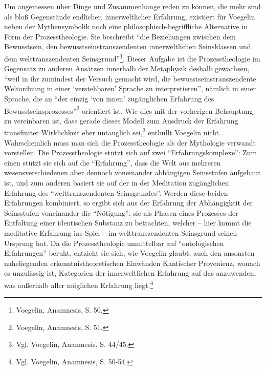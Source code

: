 Um angemessen über Dinge und Zusammenhänge reden zu können, die mehr sind als
bloß Gegenstände endlicher, innerweltlicher Erfahrung, existiert für Voegelin
neben der Mythensymbolik noch eine philosophisch-begriffliche Alternative in
Form der Prozesstheologie. Sie beschreibt "`die Beziehungen zwischen dem
Bewusstsein, den bewusstseinstranszendenten innerweltlichen Seinsklassen und
dem welttranszendenten Seinsgrund"'\footnote{Voegelin, Anamnesis, S. 50.}.
Dieser Aufgabe ist die Prozesstheologie im Gegensatz zu anderen Ansätzen
innerhalb der Metaphysik deshalb gewachsen, "`weil in ihr zumindest der
Versuch gemacht wird, die bewusstseinstranszendente Weltordnung in einer
`verstehbaren' Sprache zu interpretieren"', nämlich in einer Sprache, die an
"`der einzig `von innen' zugänglichen Erfahrung des
Bewusstseinsprozesses"'\footnote{Voegelin, Anamnesis, S. 51.} orientiert ist.
Wie dies mit der vorherigen Behauptung zu vereinbaren ist, dass gerade dieses
Modell zum Ausdruck der Erfahrung transfiniter Wirklichkeit eher untauglich
sei,\footnote{Vgl. Voegelin, Anamnesis, S.  44/45.} enthüllt Voegelin nicht.
Wahrscheinlich muss man sich die Prozesstheologie als der Mythologie verwandt
vorstellen. Die Prozesstheologie stützt sich auf zwei "`Erfahrungskomplexe"':
Zum einen stützt sie sich auf die "`Erfahrung"', dass die Welt aus mehreren
wesensverschiedenen aber dennoch voneinander abhängigen Seinsstufen aufgebaut
ist, und zum anderen basiert sie auf der in der Meditation zugänglichen
Erfahrung des "`welttranszendenten Seinsgrundes"'.  Werden diese beiden
Erfahrungen kombiniert, so ergibt sich aus der Erfahrung der Abhängigkeit der
Seinsstufen voneinander die "`Nötigung"', sie als Phasen eines Prozesses der
Entfaltung einer identischen Substanz zu betrachten, welcher -- hier kommt die
meditative Erfahrung ins Spiel -- im welttranszendenten Seinsgrund seinen
Ursprung hat. Da die Prozesstheologie unmittelbar auf "`ontologischen
Erfahrungen"' beruht, entzieht sie sich, wie Voegelin glaubt, auch den
ansonsten naheliegenden erkenntnistheoretischen Einwänden Kantischer
Provenienz, wonach es unzulässig ist, Kategorien der innerweltlichen Erfahrung
auf das anzuwenden, was außerhalb aller möglichen Erfahrung
liegt.\footnote{Vgl. Voegelin, Anamnesis, S. 50-54.}

